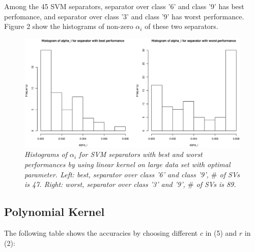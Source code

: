 \documentclass{article}
\begin{document}
Among the 45 SVM separators, separator over class '6' and class '9' has best perfomance, and separator over class '3' and class '9' has worst performance. Figure 2 show the histograms of non-zero $\alpha_{i}$ of these two separators.

\begin{figure}[htp]
\centering
\includegraphics[width=12.1cm]{large_hist_linear.eps}
\caption{\textit{Histograms of $\alpha_{i}$ for SVM separators with best and worst performances by using linear kernel on large data set with optimal parameter. Left: best, separator over class '6' and class '9', $\#$ of SVs is 47. Right: worst, separator over class '3' and '9', $\#$ of SVs is 89.}}
\end{figure}

\goodbreak

\subsection{Polynomial Kernel}

The following table shows the accuracies by choosing different $c$ in (5) and $r$ in (2):

\end{document}
